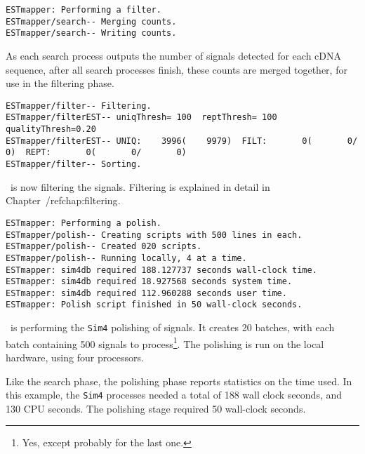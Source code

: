 \documentclass[twoside,11pt]{book}
\begin{document}
\footnotesize
\begin{verbatim}
ESTmapper: Performing a filter.
ESTmapper/search-- Merging counts.
ESTmapper/search-- Writing counts.
\end{verbatim}
\normalsize

As each search process outputs the number of signals detected for each
cDNA sequence, after all search processes finish, these counts are
merged together, for use in the filtering phase.

\footnotesize
\begin{verbatim}
ESTmapper/filter-- Filtering.
ESTmapper/filterEST-- uniqThresh= 100  reptThresh= 100  qualityThresh=0.20
ESTmapper/filterEST-- UNIQ:    3996(    9979)  FILT:       0(       0/       0)  REPT:       0(       0/       0)
ESTmapper/filter-- Sorting.
\end{verbatim}
\normalsize

\ESTmapper\ is now filtering the signals.  Filtering is explained in
detail in Chapter~/ref{chap:filtering}.

\footnotesize
\begin{verbatim}
ESTmapper: Performing a polish.
ESTmapper/polish-- Creating scripts with 500 lines in each.
ESTmapper/polish-- Created 020 scripts.
ESTmapper/polish-- Running locally, 4 at a time.
ESTmapper: sim4db required 188.127737 seconds wall-clock time.
ESTmapper: sim4db required 18.927568 seconds system time.
ESTmapper: sim4db required 112.960288 seconds user time.
ESTmapper: Polish script finished in 50 wall-clock seconds.
\end{verbatim}
\normalsize

\ESTmapper\ is performing the {\tt Sim4} polishing of signals.  It
creates 20 batches, with each batch containing 500 signals to
process\footnote{Yes, except probably for the last one.}.  The
polishing is run on the local hardware, using four processors.

Like the search phase, the polishing phase reports statistics on
the time used.  In this example, the {\tt Sim4} processes needed a
total of 188 wall clock seconds, and 130 CPU seconds.  The polishing
stage required 50 wall-clock seconds.
\end{document}
